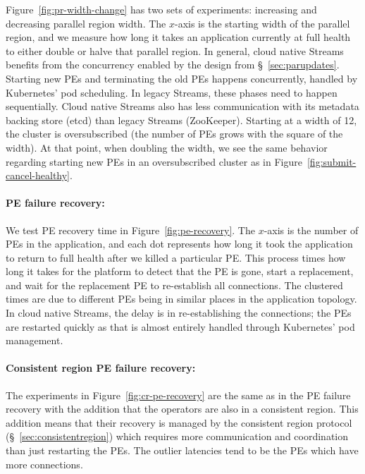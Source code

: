 Figure~\ref{fig:pr-width-change} has two sets of experiments: increasing and
decreasing parallel region width. The $x$-axis is the starting width of the
parallel region, and we measure how long it takes an application currently at
full health to either double or halve that parallel region. In general, cloud
native Streams benefits from the concurrency enabled by the design from
\S~\ref{sec:parupdates}. Starting new PEs and terminating the old PEs
happens concurrently, handled by Kubernetes' pod scheduling. In legacy Streams,
these phases need to happen sequentially. Cloud native Streams also has less
communication with its metadata backing store (etcd) than legacy Streams
(ZooKeeper). Starting at a width of 12, the cluster is oversubscribed (the
number of PEs grows with the square of the width). At that point, when doubling
the width, we see the same behavior regarding starting new PEs in an oversubscribed
cluster as in Figure~\ref{fig:submit-cancel-healthy}.

\paragraph{PE failure recovery:}
\label{sec:results:pe-recovery}

We test PE recovery time in Figure~\ref{fig:pe-recovery}. The $x$-axis is the
number of PEs in the application, and each dot represents how long it took the
application to return to full health after we killed a particular PE. This
process times how long it takes for the platform to detect that the PE is gone,
start a replacement, and wait for the replacement PE to re-establish all
connections. The clustered times are due to different PEs being in similar
places in the application topology. In cloud native Streams, the delay is in
re-establishing the connections; the PEs are restarted quickly as that is almost
entirely handled through Kubernetes' pod management.

\paragraph{Consistent region PE failure recovery:}

The experiments in Figure~\ref{fig:cr-pe-recovery} are the same as in the PE
failure recovery with the addition that the operators are also in a consistent
region. This addition means that their recovery is managed by the consistent
region protocol (\S~\ref{sec:consistentregion}) which requires more
communication and coordination than just restarting the PEs.  The outlier
latencies tend to be the PEs which have more connections.

